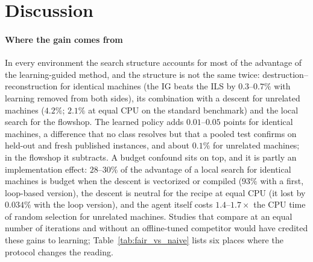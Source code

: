 \section{Discussion}
\label{sec:discussion}

\paragraph{Where the gain comes from}
In every environment the search structure accounts for most of the advantage of the learning-guided method, and the structure is not the same twice: destruction--reconstruction for identical machines (the IG beats the ILS by
$0.3$--$0.7\%$ with learning removed from both sides), its combination with a descent for unrelated machines ($4.2\%$; $2.1\%$ at equal CPU on the standard benchmark) and the local search for the flowshop. The
learned policy adds $0.01$--$0.05$ points for identical machines, a difference that no class resolves but that a pooled test confirms on held-out and fresh published instances, and about $0.1\%$ for unrelated machines;
in the flowshop it subtracts. A budget confound sits on top, and it is partly an implementation effect: $28$--$30\%$ of the advantage of a local search for identical machines is budget when the descent is vectorized or compiled ($93\%$ with a first, loop-based version), the descent is neutral for the recipe at equal CPU (it lost by $0.034\%$ with the loop version), and the agent
itself costs $1.4$--$1.7\times$ the CPU time of random selection for unrelated machines. Studies that compare at an equal number of iterations and without an offline-tuned competitor would have credited these gains to learning; Table~\ref{tab:fair_vs_naive} lists six places where the protocol changes the reading.

